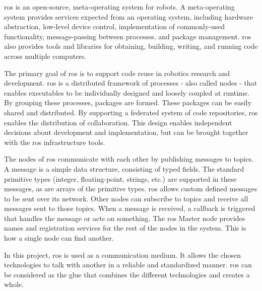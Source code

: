 \ac{ros} is an open\hyp{}source, meta\hyp{}operating system for robots. A meta\hyp{}operating system provides services expected from an operating system, including hardware abstraction, low\hyp{}level device control, implementation of commonly\hyp{}used functionality, message\hyp{}passing between processes, and package management. \acs{ros} also provides tools and libraries for obtaining, building, writing, and running code across multiple computers. \cite{ros_introduction}

The primary goal of \acs{ros} is to support code reuse in robotics research and development. \acs{ros} is a distributed framework of processes - also called nodes - that enables executables to be individually designed and loosely coupled at runtime. By grouping these processes, packages are formed. These packages can be easily shared and distributed. By supporting a federated system of code repositories, \acs{ros} enables the distribution of collaboration. This design enables independent decisions about development and implementation, but can be brought together with the \acs{ros} infrastructure tools. \cite{newman2017systematic}

The nodes of \acs{ros} communicate with each other by publishing messages to topics. A message is a simple data structure, consisting of typed fields. The standard primitive types (integer, floating\hyp{}point, strings, etc.) are supported in these messages, as are arrays of the primitive types. \acs{ros} allows custom defined messages to be sent over its network. Other nodes can subscribe to topics and receive all messages sent to those topics. When a message is received, a callback is triggered that handles the message or acts on something. The \acs{ros} Master node provides names and registration services for the rest of the nodes in the system. This is how a single node can find another. \cite{ros_messages}

In this project, \acs{ros} is used as a communication medium. It allows the chosen technologies to talk with another in a reliable and standardized manner. \acs{ros} can be considered as the glue that combines the different technologies and creates a whole.